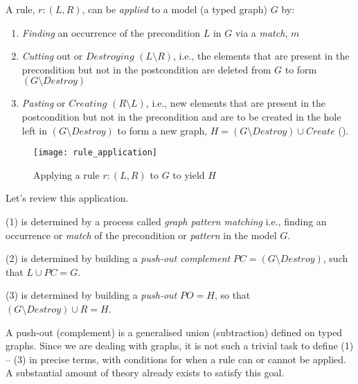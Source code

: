 A rule, $r: (L,R)$, can be \emph{applied} to a model (a typed graph) $G$ by:
\begin{enumerate}
  \item \emph{Finding} an occurrence of the precondition $L$ in $G$ via a \emph{match}, $m$
  
  \item \emph{Cutting} out or $Destroying$ $(L\setminus R)$, i.e., the elements that are present in the precondition but not in the postcondition are deleted
  from $G$ to form  $(G\setminus Destroy)$
  
  \item \emph{Pasting} or $Creating$ $(R\setminus L)$, i.e., new elements that are present in the postcondition but not in the precondition and are to be created
  in the hole left in $(G\setminus Destroy)$ to form a new graph, $H = (G\setminus Destroy) \cup Create$ (). 
  
  \end{enumerate}

\vspace{0.5cm}

\begin{figure}[htp]
\begin{center}
  \texttt{[image: rule\_application]}
  \caption[]{Applying a rule $r: (L,R)$ to $G$ to yield $H$} 
  \label{fig:rule_application}
\end{center}
\end{figure}

\vspace{0.5cm}

Let's review this application. 

(1) is determined by a process called \emph{graph pattern matching} i.e., finding an occurrence or
\emph{match} of the precondition or \emph{pattern} in the model $G$.

(2) is determined by building a \emph{push-out complement} $PC = (G\setminus Destroy)$, such that $L\cup PC = G$.

(3) is determined by building a \emph{push-out} $PO = H$, so that $(G\setminus Destroy) \cup R = H$.

A push-out (complement) is a generalised union (subtraction) defined on typed graphs. Since we are dealing with graphs, it is not such a trivial task to define
(1) -- (3) in precise terms, with conditions for when a rule can or cannot be applied. A substantial amount of theory already exists to satisfy this goal.

